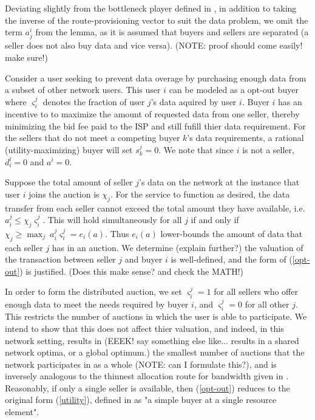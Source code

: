 \documentclass[12pt]{article}
\theoremstyle{definition}
\newcommand{\vs}{\varsigma}
\begin{document}
\begin{multicols}{2}
Deviating slightly from the
bottleneck player defined in \cite{semret}, in addition to taking the inverse
of the route-provisioning vector to suit the data problem, we omit the term $a_j^i$ from the lemma, as it is
assumed that buyers and sellers are separated (a seller does not also buy data
and vice versa).
(NOTE: proof should come easily! make sure!)

Consider a user seeking to prevent
data overage by purchasing enough data from a subset of other network users.
This user $i$ can be modeled as a opt-out buyer where $\vs_i^j$ denotes the
fraction of user $j$'s data aquired by user $i$. Buyer $i$ has an incentive to
to maximize the amount of requested data from one seller, thereby minimizing
the bid fee paid to the ISP and still fufill thier data requirement.
For the sellers that do not meet a competing buyer $k$'s data requirements, a rational (utility-maximizing) buyer will
set $s_k^j = 0$. We note that since $i$ is not a seller, $d_i^i = 0$ and $a^i = 0$.

Suppose the total amount of seller $j$'s data on the network at the instance that
user $i$ joins the auction is $\chi_j$. For the service to function as desired,
the data transfer from each seller cannot exceed the total amount they have available,
i.e. $a_i^j \le \chi_j\vs_i^j$. This will hold simultaneously for all $j$ if
and only if $\chi_j \ge \max_j \ a_i^j \vs_i^j = e_i(a)$. Thus $e_i(a)$
lower-bounds the amount of data that each seller $j$ has in an auction. We
determine (explain further?) the
valuation of the transaction between seller $j$ and buyer $i$ is well-defined,
and the form of (\ref{opt-out}) is justified. (Does this make sense? and check
the MATH!)

In order to form the distributed auction, we set $\vs_i^j=1$ for all sellers
who offer enough data to meet the needs required by buyer $i$, and $\vs_i^j=0$ for
all other $j$. This restricts the number of auctions in which the user is able to
participate. We intend to show that this does not affect thier valuation, and
indeed, in this network setting, results in
(EEEK! say something else like... results in a shared network optima, or a
global optimum.) the smallest
number of auctions that the network participates in as a whole (NOTE: can I
formulate this?), and is inversely analogous to the thinnest allocation route for
bandwidth given in \cite{lazar}. Reasonably, if only a single seller is available, then
(\ref{opt-out}) reduces to the original form (\ref{utility}), defined in
\cite{semret} as "a simple buyer at a single resource element".


\end{multicols}
\end{document}
